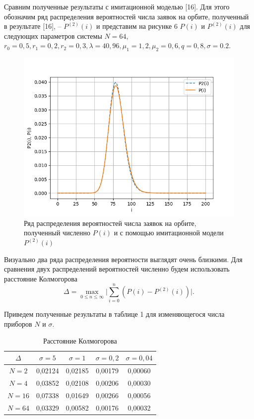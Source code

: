 Сравним полученные результаты с имитационной моделью [16]. Для этого обозначим ряд распределения вероятностей числа заявок на орбите, полученный в результате [16], -- $P^{(2)}(i)$ и представим на рисунке 6 $P(i)$  и $P^{(2)}(i)$ для следующих параметров системы $N=64$, $r_{0}=0,5, r_{1}=0,2, r_{2}=0,3, \lambda=40,96, \mu_{1}=1,2, \mu_{2}=0,6 , q=0,8, \sigma=0.2.$
\begin{figure}[H]
	\centering
	\includegraphics[width=0.6\linewidth]{pic64_0_2.png} 
	\caption{Ряд распределения вероятностей числа заявок на орбите, полученный численно $P(i)$ и с помощью имитационной модели $P^{(2)}(i)$}
	\label{ris:experimcoded}
\end{figure}
Визуально два ряда распределения вероятности выглядят очень близкими.
Для сравнения двух распределений вероятностей численно будем использовать расстояние Колмогорова
\begin{equation*}
	\Delta=\max_{0 \leq  n \leq  \infty}\bigg|\sum_{i=0}^{n}(P(i)-P^{(2)}(i))\bigg|.
\end{equation*}

Приведем полученные результаты в таблице 1 для изменяющегося числа приборов $N$ и $\sigma$.

\captionsetup[table]{justification=raggedright}
\begin{table}[h]
	\caption{Расстояние Колмогорова}
	 \centering 
	\begin{tabular}{ | c | c | c | c | c | }
		\hline
		$\Delta$ & $\sigma=5$ & $\sigma=1$ & $\sigma=0,2$  & $\sigma=0,04$ \\ \hline
		$N=2$ & 0,02124 & 0,02185 & 0,00179 & 0,00060 \\ \hline
		$N=4$ & 0,03852 & 0,02108 & 0,00206 & 0,00030 \\ \hline
		$N=16$ & 0,07338 & 0,01649 & 0,00266 & 0,00056 \\ \hline
		$N=64$ & 0,03329 & 0,00582 & 0,00176 & 0,00032 \\ 
		\hline
	\end{tabular}
\end{table}

